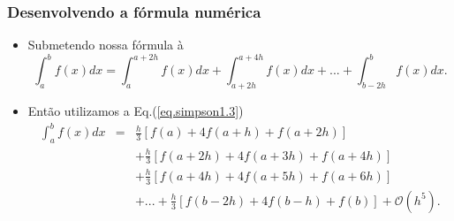 \documentclass[xcolor=table]{beamer}
\newenvironment{stepitemize}{\begin{itemize}[<+->]}{\end{itemize} }
\begin{document}
\begin{frame}%

\frametitle{Desenvolvendo a f\'{o}rmula num\'{e}rica}

\begin{stepitemize}
\item Submetendo nossa f\'{o}rmula \`{a}%
\[
\int_{a}^{b}f\left( x\right) dx=\int_{a}^{a+2h}f\left( x\right)
dx+\int_{a+2h}^{a+4h}f\left( x\right) dx+...+\int_{b-2h}^{b}f\left( x\right)
dx. 
\]

\item Ent\~{a}o utilizamos a Eq.(\ref{eq.simpson1.3})%
\begin{eqnarray*}
\int_{a}^{b}f\left( x\right) dx &=&\frac{h}{3}\left[ f\left( a\right)
+4f\left( a+h\right) +f\left( a+2h\right) \right]  \\
&&+\frac{h}{3}\left[ f\left( a+2h\right) +4f\left( a+3h\right) +f\left(
a+4h\right) \right]  \\
&&+\frac{h}{3}\left[ f\left( a+4h\right) +4f\left( a+5h\right) +f\left(
a+6h\right) \right]  \\
&&+...+\frac{h}{3}\left[ f\left( b-2h\right) +4f\left( b-h\right) +f\left(
b\right) \right] +\mathcal{O}\left( h^{5}\right) .
\end{eqnarray*}
\end{stepitemize}

\transboxout%
\end{frame}%
\end{document}
